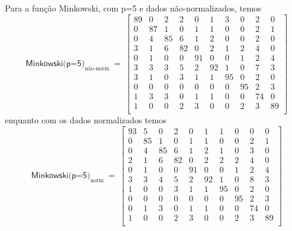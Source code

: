 \documentclass[10pt,a4paper,twocolumn]{article}
\begin{document}
      Para a função Minkowski, com p=5 e dados não-normalizados, temos
      \begin{equation*}
        \textsf{Minkowski(p=5)}_\text{não-norm}~=~ \left [
        \begin{smallmatrix}
          89 &  0 &  2 &  2 &  0 &  1 &  3 &  0 &  2 &  0 \\
           0 & 87 &  1 &  0 &  1 &  1 &  0 &  0 &  2 &  1 \\ 
           0 &  4 & 85 &  6 &  1 &  2 &  0 &  0 &  2 &  0 \\ 
           3 &  1 &  6 & 82 &  0 &  2 &  1 &  2 &  4 &  0 \\ 
           0 &  1 &  0 &  0 & 91 &  0 &  0 &  1 &  2 &  4 \\ 
           3 &  3 &  3 &  5 &  2 & 92 &  1 &  0 &  7 &  3 \\ 
           3 &  1 &  0 &  3 &  1 &  1 & 95 &  0 &  2 &  0 \\ 
           0 &  0 &  0 &  0 &  0 &  0 &  0 & 95 &  2 &  3 \\ 
           1 &  3 &  3 &  0 &  1 &  1 &  0 &  0 & 74 &  0 \\ 
           1 &  0 &  0 &  2 &  3 &  0 &  0 &  2 &  3 & 89 \\ 
        \end{smallmatrix} \right ]
      \end{equation*}
      enquanto com os dados normalizados temos
      \begin{equation*}
        \textsf{Minkowski(p=5)}_\text{norm}~=~ \left [
        \begin{smallmatrix}
          93 &  5 &  0 &  2 &  0 &  1 &  1 &  0 &  0 &  0 \\
           0 & 85 &  1 &  0 &  1 &  1 &  0 &  0 &  2 &  1 \\ 
           0 &  4 & 85 &  6 &  1 &  2 &  1 &  0 &  3 &  0 \\ 
           2 &  1 &  6 & 82 &  0 &  2 &  2 &  2 &  4 &  0 \\ 
           0 &  1 &  0 &  0 & 91 &  0 &  0 &  1 &  2 &  4 \\ 
           3 &  3 &  4 &  5 &  2 & 92 &  1 &  0 &  8 &  3 \\ 
           1 &  0 &  0 &  3 &  1 &  1 & 95 &  0 &  2 &  0 \\ 
           0 &  0 &  0 &  0 &  0 &  0 &  0 & 95 &  2 &  3 \\ 
           0 &  1 &  3 &  0 &  1 &  1 &  0 &  0 & 74 &  0 \\ 
           1 &  0 &  0 &  2 &  3 &  0 &  0 &  2 &  3 & 89 \\ 
        \end{smallmatrix} \right ]
      \end{equation*}
\end{document}

